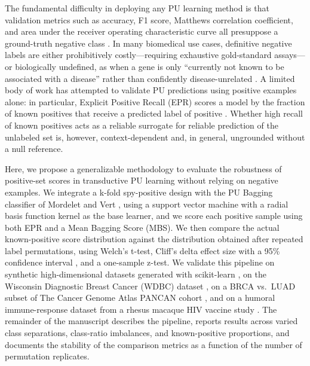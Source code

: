 The fundamental difficulty in deploying any PU learning method is that validation metrics such as accuracy, F1 score, Matthews correlation coefficient, and area under the receiver operating characteristic curve all presuppose a ground-truth negative class \cite{hanley1982auc}. In many biomedical use cases, definitive negative labels are either prohibitively costly---requiring exhaustive gold-standard assays---or biologically undefined, as when a gene is only ``currently not known to be associated with a disease'' rather than confidently disease-unrelated \cite{yang2014epu,wang2019nsemda}. A limited body of work has attempted to validate PU predictions using positive examples alone: in particular, Explicit Positive Recall (EPR) scores a model by the fraction of known positives that receive a predicted label of positive \cite{cheng2015epr}. Whether high recall of known positives acts as a reliable surrogate for reliable prediction of the unlabeled set is, however, context-dependent and, in general, ungrounded without a null reference.

Here, we propose a generalizable methodology to evaluate the robustness of positive-set scores in transductive PU learning without relying on negative examples. We integrate a k-fold spy-positive design \cite{liu2003spy} with the PU Bagging classifier of Mordelet and Vert \cite{mordelet2014bagging}, using a support vector machine with a radial basis function kernel \cite{pedregosa2011scikit} as the base learner, and we score each positive sample using both EPR \cite{cheng2015epr} and a Mean Bagging Score (MBS). We then compare the actual known-positive score distribution against the distribution obtained after repeated label permutations, using Welch's t-test, Cliff's delta effect size with a 95\% confidence interval \cite{cliff1993dominance}, and a one-sample z-test. We validate this pipeline on synthetic high-dimensional datasets generated with scikit-learn \cite{pedregosa2011scikit,abraham2014scikit}, on the Wisconsin Diagnostic Breast Cancer (WDBC) dataset \cite{wolberg1999nuclear,wolberg2002computer}, on a BRCA vs.\ LUAD subset of The Cancer Genome Atlas PANCAN cohort \cite{weinstein2013tcga}, and on a humoral immune-response dataset from a rhesus macaque HIV vaccine study \cite{lakhashe2022virosomal,marasini2021enshivig,malherbe2021adenovirus}. The remainder of the manuscript describes the pipeline, reports results across varied class separations, class-ratio imbalances, and known-positive proportions, and documents the stability of the comparison metrics as a function of the number of permutation replicates.
